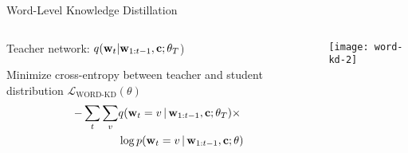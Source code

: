 

\begin{frame}{Word-Level Knowledge Distillation}
\air 
\begin{columns}
\begin{column}{6.5cm}

Teacher network: $q(\mathbf{w}_{t} | \mathbf{w}_{1:t-1}, \mathbf{c}  ; \theta_T$)  
\air 

Minimize cross-entropy between teacher and student distribution  $\mathcal{L}_{\text{WORD-KD}}(\theta)$ \\

\begin{align*}
-\sum_t \sum_v &q(\mathbf{w}_t=v \,|\, \mathbf{w}_{1: t-1}, \mathbf{c} ; \theta_T)\times \\
& \log p(\mathbf{w}_t =v \,|\, \mathbf{w}_{1: t-1}, \mathbf{c} ; \theta)
\end{align*}
\end{column}

\begin{column}{5.5cm}
\texttt{[image: word-kd-2]}
\end{column}
\end{columns}
\end{frame}



